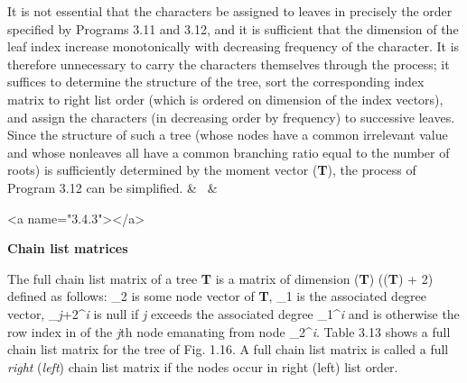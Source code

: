 {\begin{tabularx}
\par It is not essential that the characters be assigned to leaves in precisely the order specified by Programs 3.11 and 3.12, and it is sufficient that the dimension of the leaf index increase monotonically with decreasing frequency of the character. It is therefore unnecessary to carry the characters themselves through the process; it suffices to determine the structure of the tree, sort the corresponding index matrix to right list order (which is ordered on dimension of the index vectors), and assign the characters (in decreasing order by frequency) to successive leaves. Since the structure of such a tree (whose nodes have a common irrelevant value and whose nonleaves all have a common branching ratio equal to the number of roots) is sufficiently determined by the moment vector 
\textbf{\mu}(\textbf{T}), the process of Program 3.12 can be simplified.
 & \ & \\\end{tabularx}



<a name="3.4.3"></a>
\par \textbf{Chain list matrices}

\par The full chain list matrix of a tree \textbf{T} is a matrix  of dimension 
\textit{\mu}(\textbf{T}) \times (\textit{\delta}(\textbf{T}) + 2) defined as follows: 
_{2} is some node vector of \textbf{T}, 
_{1} is the associated degree vector, 
_{\textit{j}+2}^{\textit{i}} is null if \textit{j} exceeds the associated degree 
_{1}^{\textit{i}} and is otherwise the row index in  of the \textit{j}th node emanating from node
_{2}^{\textit{i}}. Table 3.13 shows a full chain list matrix for the tree of Fig. 1.16. A full chain list matrix is called a full \textit{right} (\textit{left}) chain list matrix if the nodes occur in right (left) list order.

}
